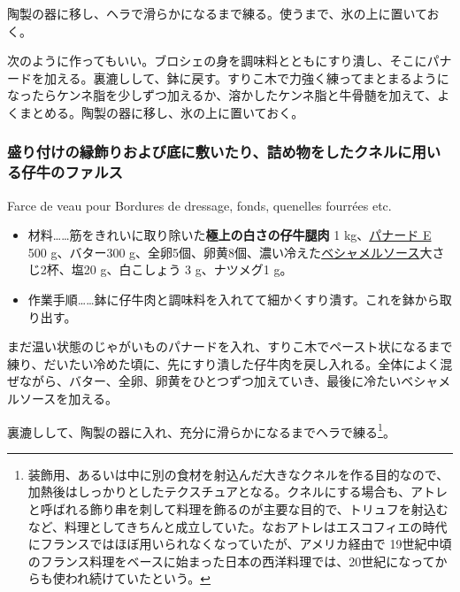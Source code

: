 \begin{recette}
陶製の器に移し、ヘラで滑らかになるまで練る。使うまで、氷の上に置いておく。

次のように作ってもいい。ブロシェの身を調味料とともにすり潰し、そこにパナードを加える。裏漉しして、鉢に戻す。すりこ木で力強く練ってまとまるようになったらケンネ脂を少しずつ加えるか、溶かしたケンネ脂と牛骨髄を加えて、よくまとめる。陶製の器に移し、氷の上に置いておく。

\atoaki{}

\hypertarget{farce-de-veau-pour-bordures}{%
\subsubsection{盛り付けの縁飾りおよび底に敷いたり、詰め物をしたクネルに用いる仔牛のファルス}\label{farce-de-veau-pour-bordures}}

\begin{frsubenv}

Farce de veau pour Bordures de dressage, fonds, quenelles fourrées etc.

\end{frsubenv}


\begin{itemize}
\item
  材料\ldots{}\ldots{}筋をきれいに取り除いた\textbf{極上の白さの仔牛腿肉}
  1 kg、\protect\hyperlink{panade-e}{パナード E} 500 g、バター300
  g、全卵5個、卵黄8個、濃い冷えた\protect\hyperlink{sauce-bechamel}{ベシャメルソース}大さじ2杯、塩20
  g、白こしょう 3 g、ナツメグ1 g。
\item
  作業手順\ldots{}\ldots{}鉢に仔牛肉と調味料を入れてて細かくすり潰す。これを鉢から取り出す。
\end{itemize}

まだ温い状態のじゃがいものパナードを入れ、すりこ木でペースト状になるまで練り、だいたい冷めた頃に、先にすり潰した仔牛肉を戻し入れる。全体によく混ぜながら、バター、全卵、卵黄をひとつずつ加えていき、最後に冷たいベシャメルソースを加える。

裏漉しして、陶製の器に入れ、充分に滑らかになるまでヘラで練る\footnote{装飾用、あるいは中に別の食材を射込んだ大きなクネルを作る目的なので、加熱後はしっかりとしたテクスチュアとなる。クネルにする場合も、アトレと呼ばれる飾り串を刺して料理を飾るのが主要な目的で、トリュフを射込むなど、料理としてきちんと成立していた。なおアトレはエスコフィエの時代にフランスではほぼ用いられなくなっていたが、アメリカ経由で
  19世紀中頃のフランス料理をベースに始まった日本の西洋料理では、20世紀になってからも使われ続けていたという。}。


\end{recette}
